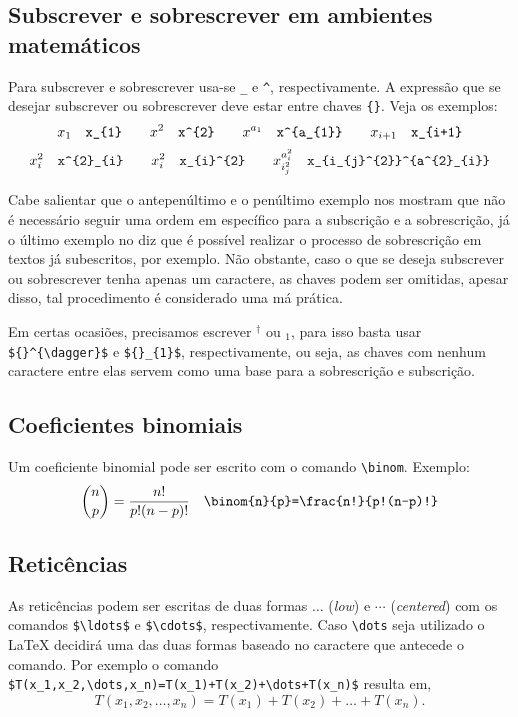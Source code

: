 \subsection{Subscrever e sobrescrever em ambientes matem\'{a}ticos}

Para subscrever e sobrescrever usa-se \verb|_| e \verb|^|, respectivamente. A express\~{a}o que se desejar subscrever ou sobrescrever deve estar entre chaves \verb|{}|. Veja os exemplos:
\begin{equation*}
    x_{1} \quad \verb|x_{1}| \qquad x^{2} \quad \verb|x^{2}| \qquad x^{a_{1}} \quad \verb|x^{a_{1}}| \qquad x_{i+1} \quad \verb|x_{i+1}|
\end{equation*}
\begin{equation*}
    x^{2}_{i} \quad \verb|x^{2}_{i}| \qquad x_{i}^{2} \quad \verb|x_{i}^{2}| \qquad x_{i_{j}^{2}}^{a^{2}_{i}} \quad \verb|x_{i_{j}^{2}}^{a^{2}_{i}}|
\end{equation*}

\noindent Cabe salientar que o antepenúltimo e o penúltimo exemplo nos mostram que n\~{a}o \'{e} necess\'{a}rio seguir uma ordem em espec\'{i}fico para a subscriç\~{a}o e a sobrescriç\~{a}o, j\'{a} o último exemplo no diz que \'{e} poss\'{i}vel realizar o processo de sobrescriç\~{a}o em textos j\'{a} subescritos, por exemplo. N\~{a}o obstante, caso o que se deseja subscrever ou sobrescrever tenha apenas um caractere, as chaves podem ser omitidas, apesar disso, tal procedimento \'{e} considerado uma m\'{a} pr\'{a}tica.

\noindent Em certas ocasi\~{o}es, precisamos escrever ${}^\dagger$ ou ${}_1$, para isso basta usar \verb|${}^{\dagger}$| e \verb|${}_{1}$|, respectivamente, ou seja, as chaves com nenhum caractere entre elas servem como uma base para a sobrescriç\~{a}o e subscriç\~{a}o.

\subsection{Coeficientes binomiais}
Um coeficiente binomial pode ser escrito com o comando \verb|\binom|. Exemplo:
\begin{equation*}
    \dbinom{n}{p} = \frac{n!}{p!(n-p)!} \quad \verb|\binom{n}{p}=\frac{n!}{p!(n-p)!}|
\end{equation*}

\subsection{Retic\^{e}ncias}
As retic\^{e}ncias podem ser escritas de duas formas $\ldots$ (\textit{low}) e $\cdots$ (\textit{centered}) com os comandos \verb|$\ldots$| e \verb|$\cdots$|, respectivamente. Caso \verb|\dots| seja utilizado o \LaTeX $ $ decidir\'{a} uma das duas formas baseado no caractere que antecede o comando. Por exemplo o comando \verb|$T(x_1,x_2,\dots,x_n)=T(x_1)+T(x_2)+\dots+T(x_n)$| resulta em,
\begin{equation*}
    T(x_1,x_2,\dots,x_n)=T(x_1)+T(x_2)+\dots+T(x_n).
\end{equation*}

